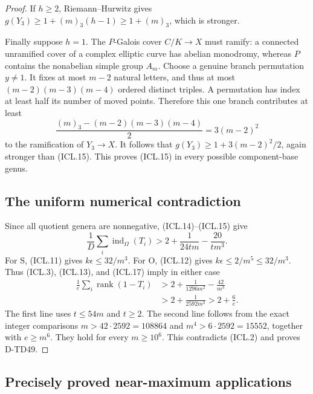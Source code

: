 \begin{proof}
If $h\ge2$, Riemann--Hurwitz gives
$g(Y_3)\ge1+(m)_3(h-1)\ge1+(m)_3$, which is stronger.

Finally suppose $h=1$.  The $P$-Galois cover $C/K\to X$ must
ramify: a connected unramified cover of a complex elliptic curve
has abelian monodromy, whereas $P$ contains the nonabelian
simple group $A_m$.  Choose a genuine branch permutation
$y\ne1$.  It fixes at most $m-2$ natural letters, and thus at
most $(m-2)(m-3)(m-4)$ ordered distinct triples.  A permutation
has index at least half its number of moved points.  Therefore
this one branch contributes at least
\[
 \frac{(m)_3-(m-2)(m-3)(m-4)}2=3(m-2)^2
 \tag{ICL.16}
\]
to the ramification of $Y_3\to X$.  It follows that
$g(Y_3)\ge1+3(m-2)^2/2$, again stronger than (ICL.15).
This proves (ICL.15) in every possible component-base genus.

\subsection*{The uniform numerical contradiction}

Since all quotient genera are nonnegative, (ICL.14)--(ICL.15)
give
\[
 \frac1D\sum_i\operatorname{ind}_\Omega(T_i)
 >2+\frac1{24tm}-\frac{20}{tm^3}.
 \tag{ICL.17}
\]
For S, (ICL.11) gives $k\epsilon\le32/m^3$.
For O, (ICL.12) gives $k\epsilon\le2/m^5\le32/m^3$.
Thus (ICL.3), (ICL.13), and (ICL.17) imply in either case
\[
 \begin{split}
 \frac1e\sum_i\operatorname{rank}(1-T_i)
 &>2+\frac1{1296m^2}-\frac{42}{m^3}\\
 &>2+\frac1{2592m^2}>2+\frac6e.
 \end{split}
 \tag{ICL.18}
\]
The first line uses $t\le54m$ and $t\ge2$.
The second line follows from the exact integer comparisons
$m>42\cdot2592=108864$ and
$m^4>6\cdot2592=15552$, together with $e\ge m^6$.
They hold for every $m\ge10^6$.
This contradicts (ICL.2) and proves D-TD49.
\end{proof}

\subsection*{Precisely proved near-maximum applications}

